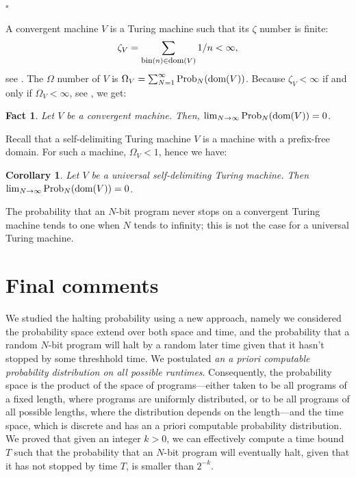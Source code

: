 \documentclass[12pt,twoside,openright]{report}
\newcommand{\QED}{\hfill $\square$}
\newcommand{\dom}{\mbox{\rm dom}}
\newcommand{\fdom}{\mbox{\rm \footnotesize{dom}}}
\newcommand{\fbin}{\mbox{\rm \footnotesize{bin}}}
\newcommand{\Prob}{{\rm Prob}}
\newtheorem{fact}[thm]{Fact}
\newtheorem{cor}[thm]{Corollary}
\begin{document}
\QED

\medskip

A convergent machine $V$ is a Turing machine such that its $\zeta$ number is finite:
$$\zeta_{V} = \sum_{\fbin (n) \in \fdom (V)} 1/n <\infty,$$ see \cite{CSNatural2006}. The $\Omega$ number of $V$ is $\Omega_{V} =\sum_{N=1}^{\infty} \Prob_{N}(\dom (V))$. Because $\zeta_{V} < \infty $ if and only if $\Omega_{V} < \infty$, see \cite{CSNatural2006}, we get:

\medskip

\begin{fact} 
Let $V$ be a convergent machine. Then, $\lim_{N \rightarrow \infty} \Prob_{N}(\dom (V)) =0$. 
\end{fact}

\medskip

Recall that a self-delimiting  Turing machine  $V$ is a machine with a prefix-free domain. For such a machine, $\Omega_{V} < 1$, hence we have:

\medskip

\begin{cor} 
Let $V$ be a universal self-delimiting Turing machine.  Then $\lim_{N \rightarrow \infty} \Prob_{N}(\dom (V)) =0$. 
\end{cor}

\medskip

The probability that an $N$-bit program never stops on a convergent Turing machine tends to one when $N$ tends to infinity; this is not the case for a universal Turing machine. 
      
\section{Final comments}

We studied the halting probability using a new approach, namely we considered the probability space extend over both space and time, and the probability that a random $N$-bit program will halt by a random later time given that it hasn't stopped by some threshhold time.  We postulated {\it an a priori computable probability distribution on all possible runtimes}.  Consequently, the probability space is the product of the space of programs---either taken to be all programs of a fixed length, where programs are uniformly distributed, or to be all programs of all possible lengths, where the distribution depends on the length---and the time space, which is discrete and has an a priori computable probability distribution.   We proved  that given an integer $k>0$, we can effectively compute  a time bound $T$ such that  the probability that an $N$-bit program will eventually halt, given that it has not stopped by time $T$, is smaller than $2^{-k}$.  
\end{document}
